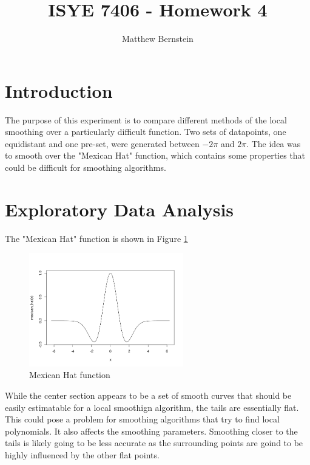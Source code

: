 \documentclass[12pt,letterpaper]{article}
\title{ISYE 7406 - Homework 4}
\author{Matthew Bernstein}
\begin{document}
\maketitle

\section*{Introduction}

The purpose of this experiment is to compare different methods of the local smoothing over a particularly difficult function. Two sets of datapoints, one equidistant and one pre-set, were generated between $-2\pi$ and $2\pi$. The idea was to smooth over the "Mexican Hat" function, which contains some properties that could be difficult for smoothing algorithms. 

\section*{Exploratory Data Analysis}

The "Mexican Hat" function is shown in Figure \ref{fig:mexican_hat} 

\begin{figure}[!htb]
  \centering
  \includegraphics[width=0.6\textwidth]{mexican_hat}
  \caption{Mexican Hat function}
  \label{fig:mexican_hat}
\end{figure}

While the center section appears to be a set of smooth curves that should be easily estimatable for a local smoothign algorithm, the tails are essentially flat. This could pose a problem for smoothing algorithms that try to find local polynomials. It also affects the smoothing parameters. Smoothing closer to the tails is likely going to be less accurate as the surrounding points are goind to be highly influenced by the other flat points.
\end{document}
